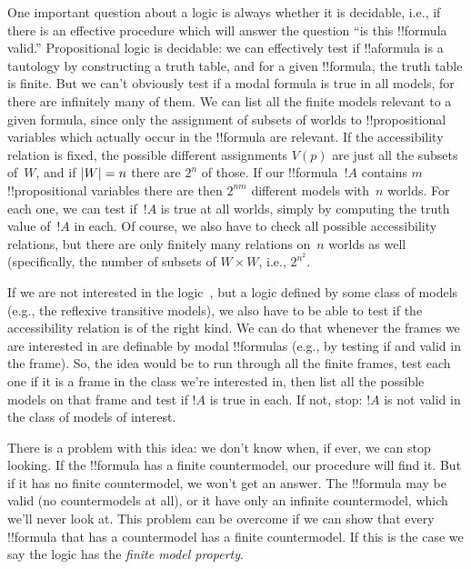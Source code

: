 \documentclass[../../../include/open-logic-section]{subfiles}
\begin{document}


One important question about a logic is always whether it is
decidable, i.e., if there is an effective procedure which will answer
the question ``is this !!{formula} valid.'' Propositional logic is
decidable: we can effectively test if !!a{formula} is a tautology by
constructing a truth table, and for a given !!{formula}, the truth
table is finite.  But we can't obviously test if a modal formula is
true in all models, for there are infinitely many of them.  We can
list all the finite models relevant to a given formula, since only the
assignment of subsets of worlds to !!{propositional variable}s which
actually occur in the !!{formula} are relevant. If the accessibility
relation is fixed, the possible different assignments $V(p)$ are just
all the subsets of~$W$, and if $\left| W \right| = n$ there are $2^n$ of
those. If our !!{formula}~$!A$ contains $m$ !!{propositional
  variable}s there are then $2^{nm}$ different models with~$n$
worlds. For each one, we can test if~$!A$ is true at all worlds,
simply by computing the truth value of~$!A$ in each. Of course, we
also have to check all possible accessibility relations, but there are
only finitely many relations on~$n$ worlds as well (specifically, the
number of subsets of $W \times W$, i.e., $2^{n^2}$.

If we are not interested in the logic~, but a logic defined by
some class of models (e.g., the reflexive transitive models), we also
have to be able to test if the accessibility relation is of the right
kind. We can do that whenever the frames we are interested in are
definable by modal !!{formula}s (e.g., by testing if  and 
valid in the frame). So, the idea would be to run through all the
finite frames, test each one if it is a frame in the class we're
interested in, then list all the possible models on that frame and
test if $!A$ is true in each. If not, stop: $!A$ is not valid in the
class of models of interest.

There is a problem with this idea: we don't know when, if ever, we can
stop looking. If the !!{formula} has a finite countermodel, our procedure will
find it. But if it has no finite countermodel, we won't get an
answer. The !!{formula} may be valid (no countermodels at all), or it
have only an infinite countermodel, which we'll never look at. This
problem can be overcome if we can show that every !!{formula} that has
a countermodel has a finite countermodel. If this is the case we say
the logic has the \emph{finite model property}.
\end{document}
